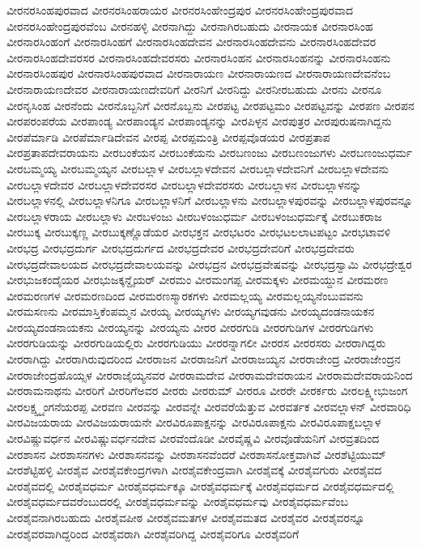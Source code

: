 {ವೀರನರಸಿಂಹಪುರವಾದ
ವೀರನರಸಿಂಹರಾಯರ
ವೀರನರಸಿಂಹೇಂದ್ರಪುರ
ವೀರನರಸಿಂಹೇಂದ್ರಪುರವಾದ
ವೀರನರಸಿಂಹೇಂದ್ರಪುರವೆಂಬ
ವೀರನಹಳ್ಳಿ
ವೀರನಾಗಿದ್ದು
ವೀರನಾಗಿರಬಹುದು
ವೀರನಾಯಕ
ವೀರನಾರಸಿಂಹ
ವೀರನಾರಸಿಂಹಂಗೆ
ವೀರನಾರಸಿಂಹಗೆ
ವೀರನಾರಸಿಂಹದೇವನ
ವೀರನಾರಸಿಂಹದೇವನು
ವೀರನಾರಸಿಂಹದೇವರ
ವೀರನಾರಸಿಂಹದೇವರಸರ
ವೀರನಾರಸಿಂಹದೇವರಸರು
ವೀರನಾರಸಿಂಹನ
ವೀರನಾರಸಿಂಹನನ್ನು
ವೀರನಾರಸಿಂಹನು
ವೀರನಾರಸಿಂಹಪುರ
ವೀರನಾರಸಿಂಹಪುರವಾದ
ವೀರನಾರಾಯಣ
ವೀರನಾರಾಯಣದ
ವೀರನಾರಾಯಣದೇವನೆಂಬ
ವೀರನಾರಾಯಣದೇವರ
ವೀರನಾರಾಯಣದೇವರಿಗೆ
ವೀರನಿಗೆ
ವೀರನಿದ್ದು
ವೀರನೀರಬಹುದು
ವೀರನು
ವೀರನೂ
ವೀರನೃಸಿಂಹ
ವೀರನೆಂದು
ವೀರನೊಬ್ಬನಿಗೆ
ವೀರನೊಬ್ಬನು
ವೀರಪಟ್ಟ
ವೀರಪಟ್ಟಮಂ
ವೀರಪಟ್ಟವನ್ನು
ವೀರಪಣ
ವೀರಪನ
ವೀರಪರಂಪರೆಯ
ವೀರಪಾಂಡ್ಯ
ವೀರಪಾಂಡ್ಯನ
ವೀರಪಾಂಡ್ಯನನ್ನು
ವೀರಪಿಳ್ಳನ
ವೀರಪುತ್ರರ
ವೀರಪುರುಷನಾಗಿದ್ದನು
ವೀರಪೆರ್ಮಾಡಿ
ವೀರಪೆರ್ಮಾಡಿದೇವನ
ವೀರಪ್ಪ
ವೀರಪ್ಪಮಂತ್ರಿ
ವೀರಪ್ಪವೊಡಯರ
ವೀರಪ್ರತಾಪ
ವೀರಪ್ರತಾಪದೇವರಾಯನು
ವೀರಬಂಕೆಯನ
ವೀರಬಂಕೆಯನು
ವೀರಬಣಂಜು
ವೀರಬಣಂಜುಗಳು
ವೀರಬಣಂಜುಧರ್ಮ
ವೀರಬಮ್ಮಯ್ಯ
ವೀರಬಮ್ಮಯ್ಯನ
ವೀರಬಲ್ಲಾಳ
ವೀರಬಲ್ಲಾಳದೇವನ
ವೀರಬಲ್ಲಾಳದೇವನಿಗೆ
ವೀರಬಲ್ಲಾಳದೇವನು
ವೀರಬಲ್ಲಾಳದೇವರ
ವೀರಬಲ್ಲಾಳದೇವರಸರ
ವೀರಬಲ್ಲಾಳದೇವರಸರು
ವೀರಬಲ್ಲಾಳನ
ವೀರಬಲ್ಲಾಳನನ್ನು
ವೀರಬಲ್ಲಾಳನಲ್ಲಿ
ವೀರಬಲ್ಲಾಳನಿಗೂ
ವೀರಬಲ್ಲಾಳನಿಗೆ
ವೀರಬಲ್ಲಾಳನು
ವೀರಬಲ್ಲಾಳಪುರವನ್ನು
ವೀರಬಲ್ಲಾಳಪುರವನ್ನೂ
ವೀರಬಲ್ಲಾಳರಾಯ
ವೀರಬಲ್ಲಾಳು
ವೀರಬಳಂಜು
ವೀರಬಳಂಜುಧರ್ಮ
ವೀರಬಳಂಜುಧರ್ಮಕ್ಕೆ
ವೀರಬುಕರಾಜ
ವೀರಬುಕ್ಕ
ವೀರಬುಕ್ಕಣ್ಣ
ವೀರಬುಕ್ಕಣ್ಣೊಡೆಯರ
ವೀರಭಕ್ತನ
ವೀರಭಟರಂ
ವೀರಭಟಲಲಾಟಪಟ್ಟಂ
ವೀರಭಟಾವಳಿ
ವೀರಭದ್ರ
ವೀರಭದ್ರದುರ್ಗ
ವೀರಭದ್ರದುರ್ಗದ
ವೀರಭದ್ರದೇವರ
ವೀರಭದ್ರದೇವರಿಗೆ
ವೀರಭದ್ರದೇವರು
ವೀರಭದ್ರದೇವಾಲಯದ
ವೀರಭದ್ರದೇವಾಲಯವನ್ನು
ವೀರಭದ್ರನ
ವೀರಭದ್ರವೇಷವನ್ನು
ವೀರಭದ್ರಸ್ವಾಮಿ
ವೀರಭದ್ರೇಶ್ವರ
ವೀರಭುಜಕಂದೈಯರ
ವೀರಭುಜಕ್ಕನ್ದೈಯರ್
ವೀರಮಂ
ವೀರಮಂಗಪ್ಪ
ವೀರಮಕ್ಕಳು
ವೀರಮಯ್ದುನ
ವೀರಮರಣ
ವೀರಮರಣಗಳ
ವೀರಮರಣದಿಂದ
ವೀರಮರಣಸ್ಮಾರಕಗಳು
ವೀರಮಲ್ಲಯ್ಯ
ವೀರಮಲ್ಲಯ್ಯನೆಂಬುವವನು
ವೀರಮಸಣನು
ವೀರಮಾಸ್ತಿಕೆಂಪಮ್ಮನ
ವೀರಯ್ಯ
ವೀರಯ್ಯಗಳು
ವೀರಯ್ಯಗವುಡನು
ವೀರಯ್ಯದಂಡನಾಯಕನ
ವೀರಯ್ಯದಂಡನಾಯಕನು
ವೀರಯ್ಯನನ್ನು
ವೀರಯ್ಯನು
ವೀರರ
ವೀರರಗುಡಿ
ವೀರರಗುಡಿಗಳ
ವೀರರಗುಡಿಗಳು
ವೀರರಗುಡಿಯನ್ನು
ವೀರರಗುಡಿಯಲ್ಲಿರು
ವೀರರಗುಡಿಯು
ವೀರರನ್ನಾಗಲೀ
ವೀರರಸ
ವೀರರಸರು
ವೀರರಾಗಿದ್ದರು
ವೀರರಾಗಿದ್ದು
ವೀರರಾಗಿರುವುದರಿಂದ
ವೀರರಾಜನ
ವೀರರಾಜನಿಗೆ
ವೀರರಾಜಯ್ಯನ
ವೀರರಾಜೇಂದ್ರ
ವೀರರಾಜೇಂದ್ರನ
ವೀರರಾಜೇಂದ್ರಹೊಯ್ಸಳ
ವೀರರಾಜೈಯ್ಯನವರ
ವೀರರಾಮದೇವ
ವೀರರಾಮದೇವರಾಯನ
ವೀರರಾಮದೇವರಾಯನಿಂದ
ವೀರರಾಮನಾಥನು
ವೀರರಿಗೆ
ವೀರರಿಗೆಅವರ
ವೀರರು
ವೀರರುಮ್
ವೀರರೂ
ವೀರರೇ
ವೀರರ್ಕರು
ವೀರಲಕ್ಷ್ಮೀಭುಜಂಗ
ವೀರಲಕ್ಷ್ಷ್ಮ್ಯಂಗನೆಯರಪ್ಪ
ವೀರವಣ
ವೀರವನ್ನು
ವೀರವನ್ನೇ
ವೀರವರೆಯೆತ್ತುವ
ವೀರವರ್ತಕ
ವೀರವಲ್ಲಾಳನ್
ವೀರವಾರಿಧಿ
ವೀರವಿಜಯರಾಯ
ವೀರವಿಜಯರಾಯನೇ
ವೀರವಿರೂಪಾಕ್ಷನನ್ನು
ವೀರವಿರೂಪಾಕ್ಷನು
ವೀರವಿರೂಪಾಕ್ಷಬಲ್ಲಾಳ
ವೀರವಿಷ್ಣುವರ್ಧನ
ವೀರವಿಷ್ಣುವರ್ಧನದೇವ
ವೀರವೆಂದೊಡೀ
ವೀರವೈಷ್ಣವಿ
ವೀರವೊಡೆಯನಿಗೆ
ವೀರವ್ರತದಿಂದ
ವೀರಶಾಸನ
ವೀರಶಾಸನಗಳು
ವೀರಶಾಸನವನ್ನು
ವೀರಶಾಸನವೆಂದರೆ
ವೀರಶಾಸನೋಕ್ತವಾಗಿವೆ
ವೀರಶೆಟ್ಟಿಯುಮ್
ವೀರಶೆಟ್ಟಿಹಳ್ಳಿ
ವೀರಶೈವ
ವೀರಶೈವಕೇಂದ್ರಗಳಾಗಿ
ವೀರಶೈವಕೇಂದ್ರವಾಗಿ
ವೀರಶೈವಕ್ಕೆ
ವೀರಶೈವಗುರು
ವೀರಶೈವದ
ವೀರಶೈವದಲ್ಲಿ
ವೀರಶೈವಧರ್ಮ
ವೀರಶೈವಧರ್ಮಕ್ಕೂ
ವೀರಶೈವಧರ್ಮಕ್ಕೆ
ವೀರಶೈವಧರ್ಮದ
ವೀರಶೈವಧರ್ಮದಲ್ಲಿ
ವೀರಶೈವಧರ್ಮದವರೆಂಬುದರಲ್ಲಿ
ವೀರಶೈವಧರ್ಮವನ್ನು
ವೀರಶೈವಧರ್ಮವು
ವೀರಶೈವಧರ್ಮವೆಂಬ
ವೀರಶೈವನಾಗಿರಬಹುದು
ವೀರಶೈವಪೀಠ
ವೀರಶೈವಮತಗಳ
ವೀರಶೈವಮತದ
ವೀರಶೈವರ
ವೀರಶೈವರನ್ನೂ
ವೀರಶೈವರವಾಗಿದ್ದರಿಂದ
ವೀರಶೈವರಾಗಿ
ವೀರಶೈವರಿಗಿದ್ದ
ವೀರಶೈವರಿಗೂ
ವೀರಶೈವರಿಗೆ
}
